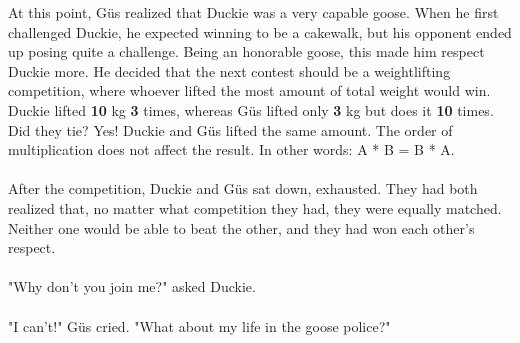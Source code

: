 {}
{At this point, Güs realized that Duckie was a very capable goose. When he first challenged Duckie, he expected winning to be a cakewalk, but his opponent ended up posing quite a challenge. Being an honorable goose, this made him respect Duckie more. He decided that the next contest should be a weightlifting competition, where whoever lifted the most amount of total weight would win. Duckie lifted \textbf{10} kg \textbf{3} times, whereas Güs lifted only \textbf{3} kg but does it \textbf{10} times. Did they tie?}
{Yes! Duckie and Güs lifted the same amount.}
{The order of multiplication does not affect the result. In other words: A * B = B * A.}
{}
\paragraph{} After the competition, Duckie and Güs sat down, exhausted. They had both realized that, no matter what competition they had, they were equally matched. Neither one would be able to beat the other, and they had won each other's respect. 
\paragraph{} "Why don't you join me?" asked Duckie.
\paragraph{} "I can't!" Güs cried. "What about my life in the goose police?"
